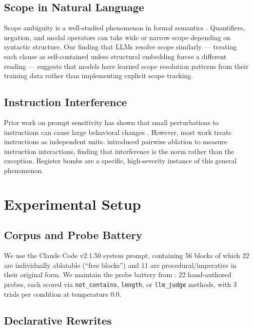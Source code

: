 \documentclass[11pt,a4paper]{article}
\begin{document}
\subsection{Scope in Natural Language}

Scope ambiguity is a well-studied phenomenon in formal semantics
\citep{may1977logical}. Quantifiers, negation, and modal operators
can take wide or narrow scope depending on syntactic structure. Our
finding that LLMs resolve scope similarly --- treating each clause
as self-contained unless structural embedding forces a different
reading --- suggests that models have learned scope resolution
patterns from their training data rather than implementing explicit
scope tracking.

\subsection{Instruction Interference}

Prior work on prompt sensitivity has shown that small perturbations
to instructions can cause large behavioral changes
\citep{prasad2025prompt}. However, most work treats instructions as
independent units. \citet{mason2026arbiter} introduced pairwise
ablation to measure instruction interactions, finding that
interference is the norm rather than the exception. Register bombs
are a specific, high-severity instance of this general phenomenon.

\section{Experimental Setup}

\subsection{Corpus and Probe Battery}

We use the Claude Code v2.1.50 system prompt, containing 56 blocks
of which 22 are individually ablatable (``free blocks'') and 11 are
procedural/imperative in their original form. We maintain the probe
battery from \citet{mason2026register}: 22 hand-authored probes,
each scored via \texttt{not\_contains}, \texttt{length}, or
\texttt{llm\_judge} methods, with 3 trials per condition at
temperature 0.0.

\subsection{Declarative Rewrites}
\end{document}
